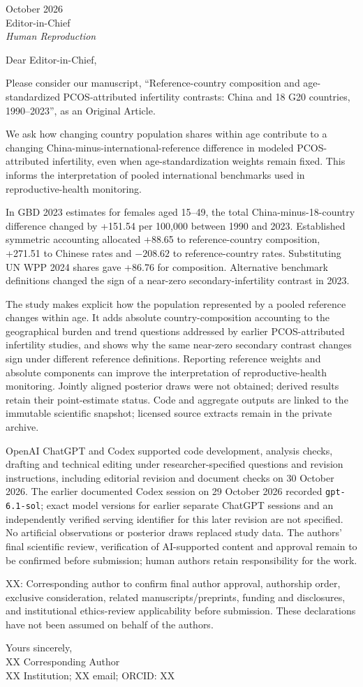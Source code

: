 \documentclass[11pt,a4paper]{article}
\begin{document}
 October 2026\\
Editor-in-Chief\\
\emph{Human Reproduction}

Dear Editor-in-Chief,

Please consider our manuscript, ``Reference-country composition and age-standardized PCOS-attributed infertility contrasts: China and 18 G20 countries, 1990--2023'', as an Original Article.

We ask how changing country population shares within age contribute to a changing China-minus-international-reference difference in modeled PCOS-attributed infertility, even when age-standardization weights remain fixed. This informs the interpretation of pooled international benchmarks used in reproductive-health monitoring.

In GBD 2023 estimates for females aged 15--49, the total China-minus-18-country difference changed by +151.54 per 100,000 between 1990 and 2023. Established symmetric accounting allocated +88.65 to reference-country composition, +271.51 to Chinese rates and $-208.62$ to reference-country rates. Substituting UN WPP 2024 shares gave +86.76 for composition. Alternative benchmark definitions changed the sign of a near-zero secondary-infertility contrast in 2023.

The study makes explicit how the population represented by a pooled reference changes within age. It adds absolute country-composition accounting to the geographical burden and trend questions addressed by earlier PCOS-attributed infertility studies, and shows why the same near-zero secondary contrast changes sign under different reference definitions. Reporting reference weights and absolute components can improve the interpretation of reproductive-health monitoring. Jointly aligned posterior draws were not obtained; derived results retain their point-estimate status. Code and aggregate outputs are linked to the immutable scientific snapshot; licensed source extracts remain in the private archive.

OpenAI ChatGPT and Codex supported code development, analysis checks, drafting and technical editing under researcher-specified questions and revision instructions, including editorial revision and document checks on 30 October 2026. The earlier documented Codex session on 29 October 2026 recorded \texttt{gpt-6.1-sol}; exact model versions for earlier separate ChatGPT sessions and an independently verified serving identifier for this later revision are not specified. No artificial observations or posterior draws replaced study data. The authors' final scientific review, verification of AI-supported content and approval remain to be confirmed before submission; human authors retain responsibility for the work.

XX: Corresponding author to confirm final author approval, authorship order, exclusive consideration, related manuscripts/preprints, funding and disclosures, and institutional ethics-review applicability before submission. These declarations have not been assumed on behalf of the authors.

Yours sincerely,\\
XX Corresponding Author\\
XX Institution; XX email; ORCID: XX
\end{document}
